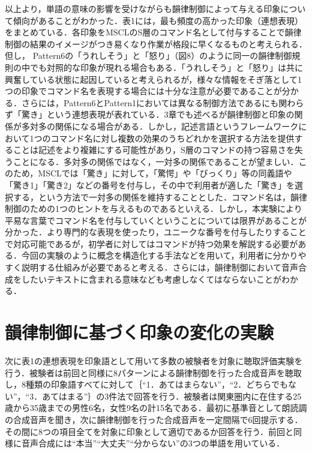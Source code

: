\documentclass[japanese]{jnlp_1.4}
\begin{document}
以上より，単語の意味の影響を受けながらも韻律制御によって与える印象について傾向があることがわかった．表1には，最も頻度の高かった印象（連想表現）をまとめている．各印象をMSCLのS層のコマンド名として付与することで韻律制御の結果のイメージがつき易くなり作業が格段に早くなるものと考えられる．但し， Pattern6の「うれしそう」と「怒り」（図8）のように同一の韻律制御規則の中でも対照的な印象が現れる場合もある．「うれしそう」と「怒り」は共に興奮している状態に起因していると考えられるが，様々な情報をそぎ落として1つの印象でコマンド名を表現する場合には十分な注意が必要であることが分かる．さらには，Pattern6とPattern1においては異なる制御方法であるにも関わらず「驚き」という連想表現が表れている．3章でも述べるが韻律制御と印象の関係が多対多の関係になる場合がある．しかし，記述言語というフレームワークにおいて1つのコマンド名に対し複数の効果のうちどれかを選択する方法を提供することは記述をより複雑にする可能性があり，S層のコマンドの持つ容易さを失うことになる．多対多の関係ではなく，一対多の関係であることが望ましい．このため，MSCLでは「驚き」に対して，「驚愕」や「びっくり」等の同義語や「驚き1」「驚き2」などの番号を付与し，その中で利用者が適した「驚き」を選択する，という方法で一対多の関係を維持することとした．コマンド名は，韻律制御のための1つのヒントを与えるものであるといえる．しかし，本実験により平易な言葉でコマンド名を付与していくということについては限界があることが分かった．より専門的な表現を使ったり，ユニークな番号を付与したりすることで対応可能であるが，初学者に対してはコマンドが持つ効果を解説する必要がある．今回の実験のように概念を構造化する手法などを用いて，利用者に分かりやすく説明する仕組みが必要であると考える．さらには，韻律制御において音声合成をしたいテキストに含まれる意味なども考慮しなくてはならないことがわかる．



\section{韻律制御に基づく印象の変化の実験}

次に表1の連想表現を印象語として用いて多数の被験者を対象に聴取評価実験を行う．被験者は前回と同様に8パターンによる韻律制御を行った合成音声を聴取し，8種類の印象語すべてに対して｛“1．あてはまらない”，“2．どちらでもない”，“3．あてはまる”｝の3件法で回答を行う．被験者は関東圏内に在住する25歳から35歳までの男性6名，女性9名の計15名である．最初に基準音として朗読調の合成音声を聞き，次に韻律制御を行った合成音声を一定間隔で6回提示する．その間に8つの項目全てを対象に印象として適切であるか回答を行う．前回と同様に音声合成には“本当”“大丈夫”“分からない”の3つの単語を用いている．
\end{document}
